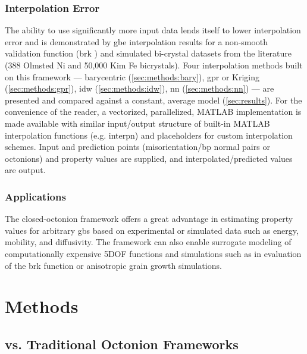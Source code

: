 \documentclass[preprint,12pt]{elsarticle}
\begin{document}
\subsubsection{Interpolation Error}
The ability to use significantly more input data lends itself to lower interpolation error and is demonstrated by \gls{gbe} interpolation results for a non-smooth validation function (\gls{brk} \cite{bulatovGrainBoundaryEnergy2014}) and simulated bi-crystal datasets from the literature (388 Olmsted Ni \cite{olmstedSurveyComputedGrain2009} and 50,000 Kim Fe \cite{kimIdentificationSchemeGrain2011} bicrystals). Four interpolation methods built on this framework --- barycentric (\ref{sec:methods:bary}), \gls{gpr} or Kriging (\ref{sec:methods:gpr}), \gls{idw} (\ref{sec:methods:idw}), \gls{nn} (\ref{sec:methods:nn}) --- are presented and compared against a constant, average model (\ref{sec:results}). For the convenience of the reader, a vectorized, parallelized, MATLAB implementation is made available \cite{bairdFiveDegreeofFreedom5DOF2020} with similar input/output structure of built-in MATLAB interpolation functions (e.g. interpn) and placeholders for custom interpolation schemes. Input and prediction points (misorientation/\gls{bp} normal pairs or octonions) and property values are supplied, and interpolated/predicted values are output.

\subsubsection{Applications}

The closed-octonion framework offers a great advantage in estimating property values for arbitrary \glspl{gb} based on experimental or simulated data such as energy, mobility, and diffusivity. The framework can also enable surrogate modeling of computationally expensive 5DOF functions and simulations such as in evaluation of the \gls{brk} function or anisotropic grain growth simulations.

\section{Methods} \label{sec:methods}

\subsection{ vs. Traditional Octonion Frameworks} \label{sec:methods:closed-mesh-comparison}
\end{document}

